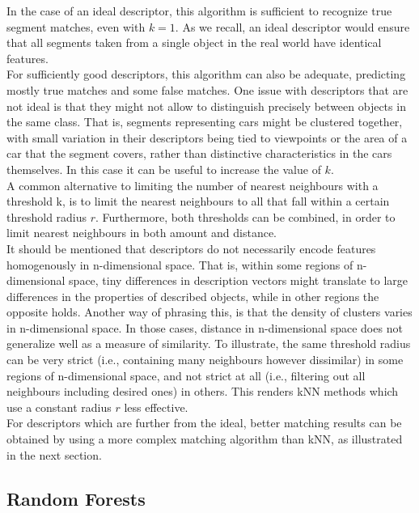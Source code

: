 In the case of an ideal descriptor, this algorithm is sufficient to recognize true segment matches, even with $k = 1$. As we recall, an ideal descriptor would ensure that all segments taken from a single object in the real world have identical features.\\ 

For sufficiently good descriptors, this algorithm can also be adequate, predicting mostly true matches and some false matches. One issue with descriptors that are not ideal is that they might not allow to distinguish precisely between objects in the same class.  
That is, segments representing cars might be clustered together, with small variation in their descriptors being tied to viewpoints or the area of a car that the segment covers, rather than distinctive characteristics in the cars themselves. In this case it can be useful to increase the value of $k$.\\

A common alternative to limiting the number of nearest neighbours with a threshold k, is to limit the nearest neighbours to all that fall within a certain threshold radius $r$. Furthermore, both thresholds can be combined, in order to limit nearest neighbours in both amount and distance.\\

It should be mentioned that descriptors do not necessarily encode features homogenously in n-dimensional space. That is, within some regions of n-dimensional space, tiny differences in description vectors might translate to large differences in the properties of described objects, while in other regions the opposite holds. Another way of phrasing this, is that the density of clusters varies in n-dimensional space. In those cases, distance in n-dimensional space does not generalize well as a measure of similarity. To illustrate, the same threshold radius can be very strict (i.e., containing many neighbours however dissimilar) in some regions of n-dimensional space, and not strict at all (i.e., filtering out all neighbours including desired ones) in others. This renders kNN methods which use a constant radius $r$ less effective.\\

For descriptors which are further from the ideal, better matching results can be obtained by using a more complex matching algorithm than kNN, as illustrated in the next section.

\subsection{Random Forests}
\label{subsec:RF}


